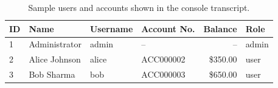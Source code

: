 \documentclass[12pt,a4paper]{report}
\begin{document}
\begin{table}[H]
  \centering
  \small
  \begin{tabularx}{\textwidth}{l X l l r l}
    \hline
    ID & Name & Username & Account No. & Balance & Role \\
    \hline
    1 & Administrator & admin & -- & -- & admin \\
    2 & Alice Johnson & alice & ACC000002 & \$350.00 & user \\
    3 & Bob Sharma & bob & ACC000003 & \$650.00 & user \\
    \hline
  \end{tabularx}
  \caption{Sample users and accounts shown in the console transcript.}
\end{table}
\end{document}

